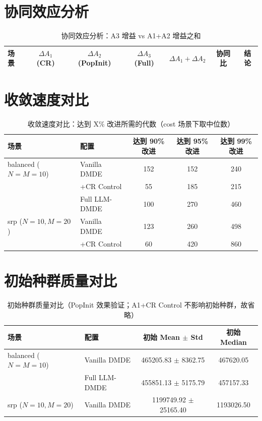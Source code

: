 \documentclass{article}
\begin{document}
\section*{协同效应分析}

\begin{table}[htbp]
\centering
\caption{协同效应分析：A3 增益 vs A1+A2 增益之和}
\label{tab:synergy}
\begin{tabular}{lcccccc}
\toprule
场景 & $\Delta A_1$ (CR) & $\Delta A_2$ (PopInit) & $\Delta A_3$ (Full) & $\Delta A_1 + \Delta A_2$ & 协同比 & 结论 \\
\midrule
\bottomrule
\end{tabular}
\end{table}

\section*{收敛速度对比}

\begin{table}[htbp]
\centering
\caption{收敛速度对比：达到 X\% 改进所需的代数（cost 场景下取中位数）}
\label{tab:convergence_speed}
\begin{tabular}{llccc}
\toprule
场景 & 配置 & 达到 90\% 改进 & 达到 95\% 改进 & 达到 99\% 改进 \\
\midrule
balanced ($N=M=10$) & Vanilla DMDE & 152 & 152 & 240 \\
 & +CR Control & 55 & 185 & 215 \\
 & Full LLM-DMDE & 100 & 270 & 460 \\
\midrule
srp ($N=10, M=20$) & Vanilla DMDE & 123 & 260 & 498 \\
 & +CR Control & 60 & 420 & 860 \\
\bottomrule
\end{tabular}
\end{table}

\section*{初始种群质量对比}

\begin{table}[htbp]
\centering
\caption{初始种群质量对比（PopInit 效果验证；A1+CR Control 不影响初始种群，故省略）}
\label{tab:initial_pop}
\begin{tabular}{llcc}
\toprule
场景 & 配置 & 初始 Mean $\pm$ Std & 初始 Median \\
\midrule
balanced ($N=M=10$) & Vanilla DMDE & 465205.83 $\pm$ 8362.75 & 467620.05 \\
 & Full LLM-DMDE & 455851.13 $\pm$ 5175.79 & 457157.33 \\
\midrule
srp ($N=10, M=20$) & Vanilla DMDE & 1199749.92 $\pm$ 25165.40 & 1193026.50 \\
\bottomrule
\end{tabular}
\end{table}
\end{document}
